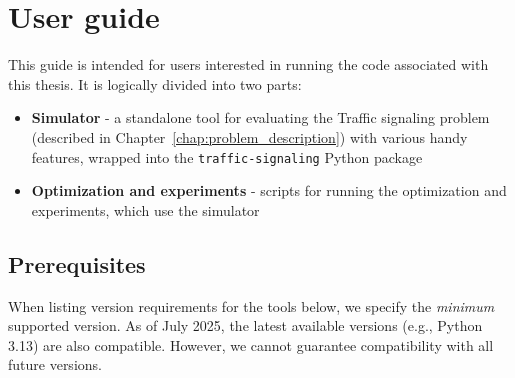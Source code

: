 \chapter{User guide} \label{chap:user_guide}

This guide is intended for users interested in running the code associated with this thesis. It is logically divided into two parts:
\begin{itemize}
    \item \textbf{Simulator} - a standalone tool for evaluating the Traffic signaling problem (described in Chapter~\ref{chap:problem_description}) with various handy features, wrapped into the \verb|traffic-signaling| Python package
    \item \textbf{Optimization and experiments} - scripts for running the optimization and experiments, which use the simulator
\end{itemize}

\section{Prerequisites}

When listing version requirements for the tools below, we specify the \textit{minimum} supported version. As of July 2025, the latest available versions (e.g., Python 3.13) are also compatible. However, we cannot guarantee compatibility with all future versions.

\bigskip


